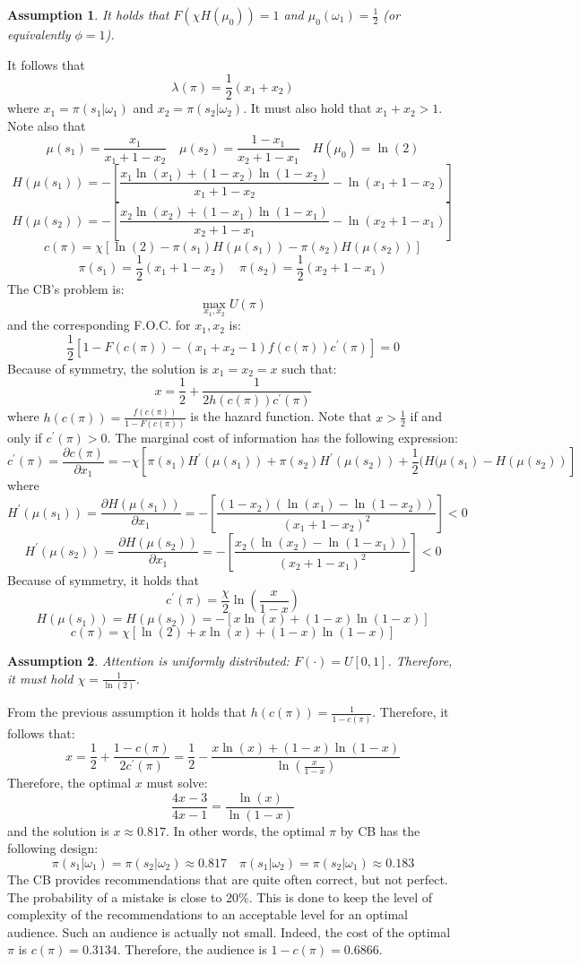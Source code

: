 \documentclass{article}
\newtheorem{assumption}{Assumption}
\begin{document}
\begin{assumption}
    It holds that $F(\chi H(\mu_0))=1$ and $\mu_0(\omega_1)=\frac{1}{2}$ (or equivalently $\phi=1$).
\end{assumption}
It follows that
$$\lambda(\pi)=\frac{1}{2}(x_1+x_2)$$
where $x_1=\pi(s_1|\omega_1)$ and $x_2=\pi(s_2|\omega_2)$. It must also hold that $x_1+x_2>1$. Note also that
$$\mu(s_1)=\frac{x_1}{x_1+1-x_2} \quad \mu(s_2)=\frac{1-x_1}{x_2+1-x_1}\quad H(\mu_0)=\ln(2)$$
$$H(\mu(s_1))=-\left[\frac{x_1\ln(x_1)+(1-x_2)\ln(1-x_2)}{x_1+1-x_2}-\ln(x_1+1-x_2)\right]$$
$$H(\mu(s_2))=-\left[\frac{x_2\ln(x_2)+(1-x_1)\ln(1-x_1)}{x_2+1-x_1}-\ln(x_2+1-x_1)\right]$$
$$c(\pi)=\chi[\ln(2)-\pi(s_1)H(\mu(s_1))-\pi(s_2)H(\mu(s_2))]$$
$$\pi(s_1)=\frac{1}{2}(x_1+1-x_2) \quad \pi(s_2)=\frac{1}{2}(x_2+1-x_1)$$
The CB's problem is:
$$\max_{x_1,x_2} U(\pi)$$
and the corresponding F.O.C. for $x_1,x_2$ is:
$$\frac{1}{2}\left[1-F(c(\pi))-(x_1+x_2-1)f(c(\pi))c^\prime(\pi)\right]=0$$
Because of symmetry, the solution is $x_1=x_2=x$ such that:
$$x=\frac{1}{2}+\frac{1}{2h(c(\pi))c^\prime(\pi)}$$
where $h(c(\pi))=\frac{f(c(\pi))}{1-F(c(\pi))}$ is the hazard function.
Note that $x>\frac{1}{2}$ if and only if $c^\prime(\pi)>0$.
The marginal cost of information has the following expression:
$$c^\prime(\pi)=\frac{\partial c(\pi)}{\partial x_1}=-\chi\left[\pi(s_1)H^\prime(\mu(s_1))+\pi(s_2)H^\prime(\mu(s_2))+\frac{1}{2}(H(\mu(s_1)-H(\mu(s_2))\right]$$
where 
$$H^\prime(\mu(s_1))=\frac{\partial H(\mu(s_1))}{\partial x_1}=-\left[\frac{(1-x_2)(\ln(x_1)-\ln(1-x_2))}{(x_1+1-x_2)^2}\right]<0$$
$$H^\prime(\mu(s_2))=\frac{\partial H(\mu(s_2))}{\partial x_1}=-\left[\frac{x_2(\ln(x_2)-\ln(1-x_1))}{(x_2+1-x_1)^2}\right]<0$$
Because of symmetry, it holds that
$$c^\prime(\pi)=\frac{\chi}{2}\ln\left(\frac{x}{1-x}\right)$$
$$H(\mu(s_1))=H(\mu(s_2))=-[x\ln(x)+(1-x)\ln(1-x)]$$
$$c(\pi)=\chi[\ln(2)+x\ln(x)+(1-x)\ln(1-x)]$$
\begin{assumption}
    Attention is uniformly distributed: $F(\cdot)=U[0,1]$. Therefore, it must hold $\chi=\frac{1}{\ln(2)}$. 
\end{assumption}
From the previous assumption it holds that $h(c(\pi))=\frac{1}{1-c(\pi)}$. Therefore, it follows that:
$$x=\frac{1}{2}+\frac{1-c(\pi)}{2c^\prime(\pi)}=\frac{1}{2}-\frac{x\ln(x)+(1-x)\ln(1-x)}{\ln\left(\frac{x}{1-x}\right)}$$
Therefore, the optimal $x$ must solve:
$$\frac{4x-3}{4x-1}=\frac{\ln(x)}{\ln(1-x)}$$
and the solution is $x\approx 0.817$. In other words, the optimal $\pi$ by CB has the following design:
$$\pi(s_1|\omega_1)=\pi(s_2|\omega_2)\approx 0.817 \quad \pi(s_1|\omega_2)=\pi(s_2|\omega_1)\approx 0.183$$
The CB provides recommendations that are quite often correct, but not perfect. The probability of a mistake is close to $20\%$. This is done to keep the level of complexity of the recommendations to an acceptable level for an optimal audience. Such an audience is actually not small. Indeed, the cost of the optimal $\pi$ is $c(\pi)=0.3134$. Therefore, the audience is $1-c(\pi)=0.6866$.
\end{document}
